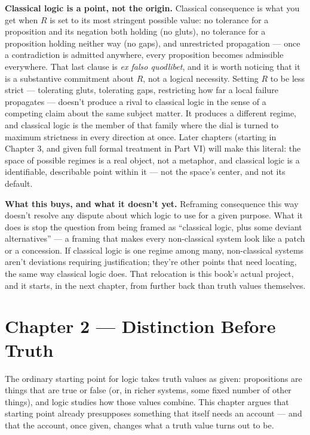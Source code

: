 \textbf{Classical logic is a point, not the origin.} Classical consequence is
what you get when \(R\) is set to its most stringent possible value: no
tolerance for a proposition and its negation both holding (no gluts), no
tolerance for a proposition holding neither way (no gaps), and
unrestricted propagation --- once a contradiction is admitted anywhere, every
proposition becomes admissible everywhere. That last clause is
\emph{ex falso quodlibet}, and it is worth noticing that it is a substantive
commitment about \(R\), not a logical necessity. Setting \(R\) to be less
strict --- tolerating gluts, tolerating gaps, restricting how far a local
failure propagates --- doesn't produce a rival to classical logic in the
sense of a competing claim about the same subject matter. It produces a
different regime, and classical logic is the member of that family
where the dial is turned to maximum strictness in every direction at
once. Later chapters (starting in Chapter 3, and given full formal
treatment in Part VI) will make this literal: the space of possible
regimes is a real object, not a metaphor, and classical logic is a
identifiable, describable point within it --- not the space's center, and
not its default.

\textbf{What this buys, and what it doesn't yet.} Reframing consequence this
way doesn't resolve any dispute about which logic to use for a given
purpose. What it does is stop the question from being framed as ``classical
logic, plus some deviant alternatives'' --- a framing that makes every
non-classical system look like a patch or a concession. If classical
logic is one regime among many, non-classical systems aren't deviations
requiring justification; they're other points that need locating, the
same way classical logic does. That relocation is this book's actual
project, and it starts, in the next chapter, from further back than
truth values themselves.

\hypertarget{chapter-2-distinction-before-truth}{%
\chapter*{Chapter 2 --- Distinction Before Truth}
\label{chapter-2-distinction-before-truth}}

The ordinary starting point for logic takes truth values as given:
propositions are things that are true or false (or, in richer systems,
some fixed number of other things), and logic studies how those values
combine. This chapter argues that starting point already presupposes
something that itself needs an account --- and that the account, once
given, changes what a truth value turns out to be.

